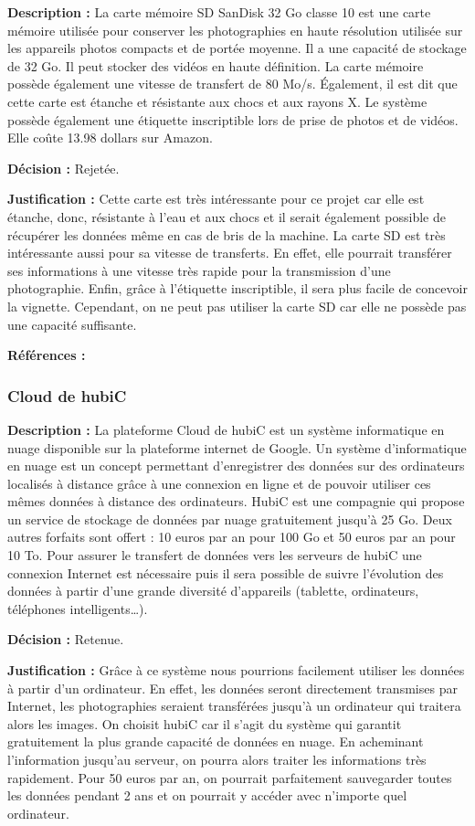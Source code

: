 \textbf{Description :} La carte mémoire SD SanDisk 32 Go classe 10 est une carte mémoire utilisée pour conserver les photographies en haute résolution utilisée sur les appareils photos compacts et de portée moyenne. Il a une capacité de stockage de 32 Go. Il peut stocker des vidéos en haute définition. La carte mémoire possède également une vitesse de transfert de 80 Mo/s. Également, il est dit que cette carte est étanche et résistante aux chocs et aux rayons X. Le système possède également une étiquette inscriptible lors de prise de photos et de vidéos. Elle coûte 13.98 dollars sur Amazon.

\textbf{Décision :} Rejetée.

\textbf{Justification :} Cette carte est très intéressante pour ce projet car elle est étanche, donc, résistante à l’eau et aux chocs et il serait également possible de récupérer les données même en cas de bris de la machine. La carte SD est très intéressante aussi pour sa vitesse de transferts. En effet, elle pourrait transférer ses informations à une vitesse très rapide pour la transmission d’une photographie. Enfin, grâce à l’étiquette inscriptible, il sera plus facile de concevoir la vignette. Cependant, on ne peut pas utiliser la carte SD car elle ne possède pas une capacité suffisante.

\textbf{Références :} \cite{casd} \cite{amsd}

\subsubsection{Cloud de hubiC}
\textbf{Description :} La plateforme Cloud de hubiC est un système informatique en nuage disponible sur la plateforme internet de Google. Un système d’informatique en nuage est un concept permettant d’enregistrer des données sur des ordinateurs localisés à distance grâce à une connexion en ligne et de pouvoir utiliser ces mêmes données à distance des ordinateurs. HubiC est une compagnie qui propose un service de stockage de données par nuage gratuitement jusqu’à 25 Go. Deux autres forfaits sont offert : 10 euros par an pour 100 Go et 50 euros par an pour 10 To. Pour assurer le transfert de données vers les serveurs de hubiC une connexion Internet est nécessaire puis il sera possible de suivre l’évolution des données à partir d’une grande diversité d’appareils (tablette, ordinateurs, téléphones intelligents…). 

\textbf{Décision :} Retenue.

\textbf{Justification :} Grâce à ce système nous pourrions facilement utiliser les données à partir d’un ordinateur. En effet, les données seront directement transmises par Internet, les photographies seraient transférées jusqu’à un ordinateur qui traitera alors les images. On choisit hubiC car il s’agit du système qui garantit gratuitement la plus grande capacité de données en nuage.  En acheminant l’information jusqu’au serveur, on pourra alors traiter les informations très rapidement. Pour 50 euros par an, on pourrait parfaitement sauvegarder toutes les données pendant 2 ans et on pourrait y accéder avec n’importe quel ordinateur.

